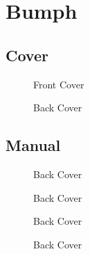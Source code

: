 \chapter{Bumph}

\section*{Cover}
\begin{figure}[H]
  {
    \begin{adjustbox}{width=10cm,center}
    \end{adjustbox}
  }\caption[]{Front Cover}
\end{figure}

\begin{figure}[H]
  {
    \begin{adjustbox}{width=10cm,center}
    \end{adjustbox}
  }\caption[]{Back Cover}
\end{figure}

\section*{Manual}

\begin{figure}[H]
  {
    \begin{adjustbox}{width=10cm,center}
    \end{adjustbox}
  }\caption[]{Back Cover}
\end{figure}

\begin{figure}[H]
  {
    \begin{adjustbox}{width=10cm,center}
    \end{adjustbox}
  }\caption[]{Back Cover}
\end{figure}

\begin{figure}[H]
  {
    \begin{adjustbox}{width=10cm,center}
    \end{adjustbox}
  }\caption[]{Back Cover}
\end{figure}

\begin{figure}[H]
  {
    \begin{adjustbox}{width=10cm,center}
    \end{adjustbox}
  }\caption[]{Back Cover}
\end{figure}

